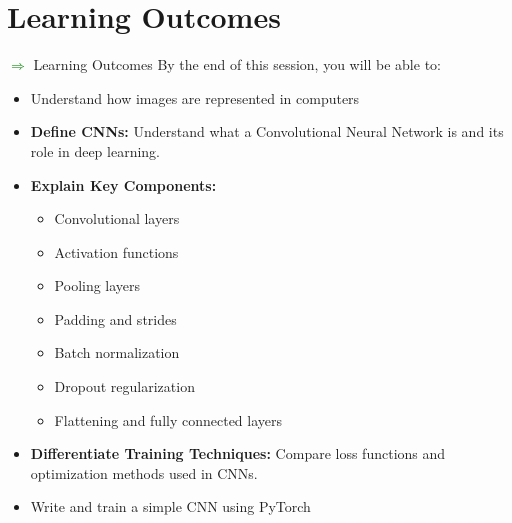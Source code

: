 \section{Learning Outcomes}
\begin{frame}[allowframebreaks]{\textcolor{green}{$\Rightarrow$} Learning Outcomes}
    By the end of this session, you will be able to:
    \begin{itemize}
        \item Understand how images are represented in computers
        \item \textbf{Define CNNs:} Understand what a Convolutional Neural Network is and its role in deep learning.
        \item \textbf{Explain Key Components:}
        \begin{itemize}
            \item Convolutional layers
            \item Activation functions
            \item Pooling layers
            \item Padding and strides
            \item Batch normalization
            \item Dropout regularization
            \item Flattening and fully connected layers
        \end{itemize}
        \item \textbf{Differentiate Training Techniques:} Compare loss functions and optimization methods used in CNNs.
        \item Write and train a simple CNN using PyTorch
    \end{itemize}
\end{frame}